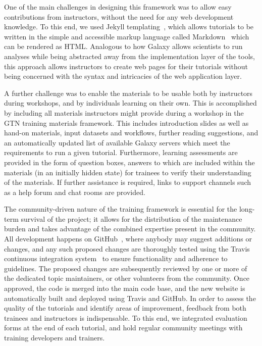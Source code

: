 One of the main challenges in designing this framework was to allow easy contributions from instructors, without the need for any web development knowledge. To this end, we used Jekyll templating~\cite{url-jekyll}, which allows tutorials to be written in the simple and accessible markup language called Markdown~\cite{url-markdown} which can be rendered as HTML\@. Analogous to how Galaxy allows scientists to run analyses while being abstracted away from the implementation layer of the tools, this approach allows instructors to create web pages for their tutorials without being concerned with the syntax and intricacies of the web application layer.

A further challenge was to enable the materials to be usable both by instructors during workshops, and by individuals learning on their own. This is accomplished by including all materials instructors might provide during a workshop in the GTN training materials framework. This includes introduction slides as well as hand-on materials, input datasets and workflows, further reading suggestions, and an automatically updated list of available Galaxy servers which meet the requirements to run a given tutorial. Furthermore, learning assessments are provided in the form of question boxes, answers to which are included within the materials (in an initially hidden state) for trainees to verify their understanding of the materials. If further assistance is required, links to support channels such as a help forum and chat rooms are provided.

The community-driven nature of the training framework is essential for the long-term survival of the project; it allows for the distribution of the maintenance burden and takes advantage of the combined expertise present in the community. All development happens on GitHub~\cite{url-github}, where anybody may suggest additions or changes, and any such proposed changes are thoroughly tested using the Travis continuous integration system~\cite{travis-ci} to ensure functionality and adherence to guidelines. The proposed changes are subsequently reviewed by one or more of the dedicated topic maintainers, or other volunteers from the community. Once approved, the code is merged into the main code base, and the new website is automatically built and deployed using Travis and GitHub. In order to assess the quality of the tutorials and identify areas of improvement, feedback from both trainees and instructors is indispensable. To this end, we integrated evaluation forms at the end of each tutorial, and hold regular community meetings with training developers and trainers.

